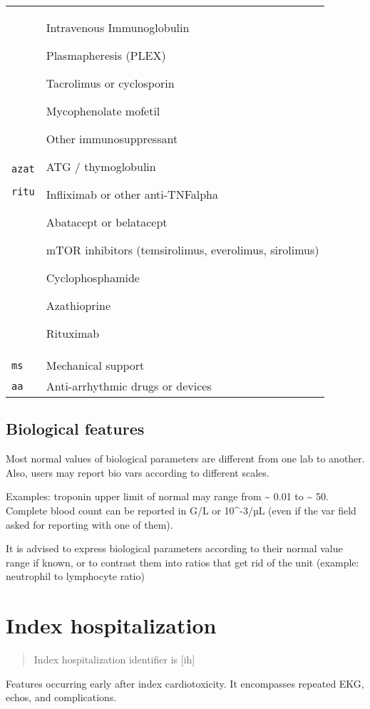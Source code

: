 \documentclass[
]{book}
\begin{document}
\begin{longtable}[]{@{}
  >{\raggedright\arraybackslash}p{}
  >{\raggedright\arraybackslash}p{}@{}}
\texttt{azat}

\texttt{ritu} & Intravenous Immunoglobulin

Plasmapheresis (PLEX)

Tacrolimus or cyclosporin

Mycophenolate mofetil

Other immunosuppressant

ATG / thymoglobulin

Infliximab or other anti-TNFalpha

Abatacept or belatacept

mTOR inhibitors (temsirolimus, everolimus, sirolimus)

Cyclophosphamide

Azathioprine

Rituximab \\
\texttt{ms} & Mechanical support \\
\texttt{aa} & Anti-arrhythmic drugs or devices \\
\bottomrule()
\end{longtable}

\hypertarget{biological-features}{%
\section{Biological features}\label{biological-features}}

Most normal values of biological parameters are different from one lab to another. Also, users may report bio vars according to different scales.

Examples: troponin upper limit of normal may range from \textasciitilde{} 0.01 to \textasciitilde{} 50. Complete blood count can be reported in G/L or 10\^{}-3/µL (even if the var field asked for reporting with one of them).

It is advised to express biological parameters according to their normal value range if known, or to contrast them into ratios that get rid of the unit (example: neutrophil to lymphocyte ratio)

\hypertarget{index_h}{%
\chapter{Index hospitalization}\label{index_h}}

\begin{quote}
Index hospitalization identifier is {[}ih{]}
\end{quote}

Features occurring early after index cardiotoxicity. It encompasses repeated EKG, echos, and complications.
\end{document}
